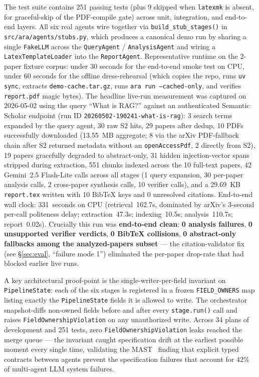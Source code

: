 \documentclass[12pt,a4paper]{article}
\begin{document}
The test suite contains 251 passing tests (plus 9 skipped when \texttt{latexmk} is
absent, for graceful-skip of the PDF-compile gate) across unit, integration, and
end-to-end layers. All six real agents wire together via
\texttt{build\_stub\_stages()} in \texttt{src/ara/agents/stubs.py}, which produces
a canonical demo run by sharing a single \texttt{FakeLLM} across the
\texttt{QueryAgent} / \texttt{AnalysisAgent} and wiring a \texttt{LatexTemplateLoader}
into the \texttt{ReportAgent}. Representative runtime on the 2-paper fixture corpus:
under 30 seconds for the end-to-end smoke test on CPU, under 60 seconds for the
offline dress-rehearsal (which copies the repo, runs \texttt{uv sync}, extracts
\texttt{demo-cache.tar.gz}, runs \texttt{ara run --cached-only}, and verifies
\texttt{report.pdf} magic bytes). The headline live-run measurement was
captured on 2026-05-02 using the query ``What is RAG?'' against an
authenticated Semantic Scholar endpoint (run ID
\texttt{20260502-190241-what-is-rag}): 3 search terms expanded by the query
agent, 30 raw S2 hits, 29 papers after dedup, 10 PDFs successfully downloaded
(13.55~MB aggregate; 8 via the arXiv PDF-fallback chain after S2 returned
metadata without an \texttt{openAccessPdf}, 2 directly from S2), 19 papers
gracefully degraded to abstract-only, 31 hidden injection-vector spans stripped
during extraction, 551 chunks indexed across the 10 full-text papers, 42
Gemini~2.5 Flash-Lite calls across all stages (1 query expansion, 30 per-paper
analysis calls, 2 cross-paper synthesis calls, 10 verifier calls), and a
29.69~KB \texttt{report.tex} written with 10 BibTeX keys and 0 unresolved
citations. End-to-end wall clock: 331~seconds on CPU (retrieval~162.7s,
dominated by arXiv's 3-second per-call politeness delay; extraction~47.3s;
indexing~10.5s; analysis~110.7s; report~0.02s). Crucially this run was
\textbf{end-to-end clean}: \textbf{0 analysis failures}, \textbf{0 unsupported
verifier verdicts}, \textbf{0 BibTeX collisions}, \textbf{0 abstract-only
fallbacks among the analyzed-papers subset} --- the citation-validator fix
(see \S\ref{sec:eval}, ``failure mode 1'') eliminated the per-paper drop-rate
that had blocked earlier live runs.

A key architectural proof-point is the single-writer-per-field invariant on
\texttt{PipelineState}: each of the six stages is registered in a frozen
\texttt{FIELD\_OWNERS} map listing exactly the \texttt{PipelineState} fields it is
allowed to write. The orchestrator snapshot-diffs non-owned fields before and after
every \texttt{stage.run()} call and raises \texttt{FieldOwnershipViolation} on any
unauthorized write. Across 34 plans of development and 251 tests, zero
\texttt{FieldOwnershipViolation} leaks reached the merge queue --- the invariant
caught specification drift at the earliest possible moment every single time,
validating the MAST~\citep{cemri2025mast} finding that explicit typed contracts
between agents prevent the specification failures that account for 42\% of
multi-agent LLM system failures.
\end{document}
